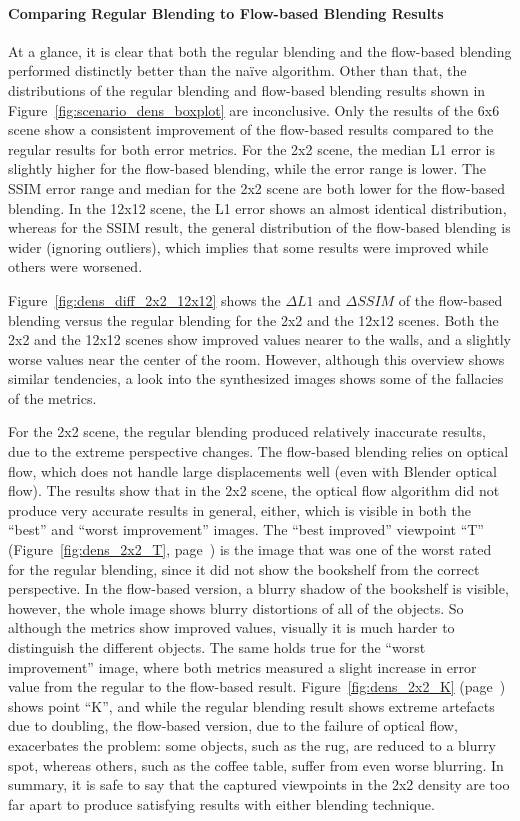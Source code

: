 \paragraph{Comparing Regular Blending to Flow-based Blending Results}
At a glance, it is clear that both the regular blending and the flow-based blending performed distinctly better than the na\"ive algorithm. Other than that, the distributions of the regular blending and flow-based blending results shown in Figure~\ref{fig:scenario_dens_boxplot} are inconclusive. Only the results of the 6x6 scene show a consistent improvement of the flow-based results compared to the regular results for both error metrics. For the 2x2 scene, the median L1 error is slightly higher for the flow-based blending, while the error range is lower. The SSIM error range and median for the 2x2 scene are both lower for the flow-based blending. In the 12x12 scene, the L1 error shows an almost identical distribution, whereas for the SSIM result, the general distribution of the flow-based blending is wider (ignoring outliers), which implies that some results were improved while others were worsened.

Figure~\ref{fig:dens_diff_2x2_12x12} shows the $\Delta L1$ and $\Delta SSIM$ of the flow-based blending versus the regular blending for the 2x2 and the 12x12 scenes. Both the 2x2 and the 12x12 scenes show improved values nearer to the walls, and a slightly worse values near the center of the room. However, although this overview shows similar tendencies, a look into the synthesized images shows some of the fallacies of the metrics. 

For the 2x2 scene, the regular blending produced relatively inaccurate results, due to the extreme perspective changes. The flow-based blending relies on optical flow, which does not handle large displacements well (even with Blender optical flow). The results show that in the 2x2 scene, the optical flow algorithm did not produce very accurate results in general, either, which is visible in both the ``best'' and ``worst improvement'' images.
The ``best improved'' viewpoint ``T'' (Figure~\ref{fig:dens_2x2_T}, page~\pageref{fig:dens_2x2_T}) is the image that was one of the worst rated for the regular blending, since it did not show the bookshelf from the correct perspective. In the flow-based version, a blurry shadow of the bookshelf is visible, however, the whole image shows blurry distortions of all of the objects. So although the metrics show improved values, visually it is much harder to distinguish the different objects.
The same holds true for the ``worst improvement'' image, where both metrics measured a slight increase in error value from the regular to the flow-based result. Figure~\ref{fig:dens_2x2_K} (page~\pageref{fig:dens_2x2_K}) shows point ``K'', and while the regular blending result shows extreme artefacts due to doubling, the flow-based version, due to the failure of optical flow, exacerbates the problem: some objects, such as the rug, are reduced to a blurry spot, whereas others, such as the coffee table, suffer from even worse blurring. In summary, it is safe to say that the captured viewpoints in the 2x2 density are too far apart to produce satisfying results with either blending technique.

